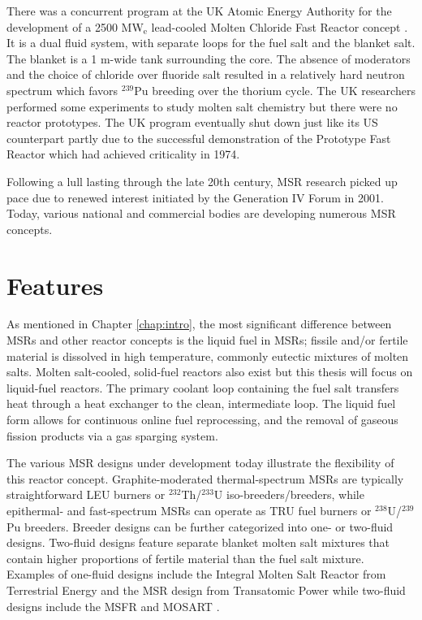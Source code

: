 There was a concurrent program at the UK Atomic Energy Authority for the
development of a 2500 MW$_{\text{e}}$ lead-cooled Molten Chloride Fast Reactor
concept \cite{smith_assessment_1974}. It is a dual fluid system,
with separate loops for the fuel salt and the blanket salt. The blanket is a
1 m-wide tank surrounding the core. The absence of moderators and the choice
of chloride over fluoride salt resulted in a relatively hard neutron spectrum
which favors $^{239}$Pu breeding over the thorium cycle. The UK researchers
performed some experiments to study molten salt chemistry but there were no
reactor prototypes. The UK program eventually shut down just like its
US counterpart partly due to the successful demonstration of the Prototype
Fast Reactor which had achieved criticality in 1974.

Following a lull lasting through the late 20th century, \gls{MSR} research
picked up pace due to renewed interest initiated by the Generation IV Forum in
2001. Today, various national and commercial bodies are developing numerous
\gls{MSR} concepts.

\section{Features}

As mentioned in Chapter \ref{chap:intro}, the most significant difference
between \glspl{MSR} and other reactor concepts is the liquid fuel in
\glspl{MSR}; fissile and/or fertile material is dissolved in high temperature,
commonly eutectic mixtures of molten salts. Molten salt-cooled, solid-fuel
reactors also exist but this thesis will focus on liquid-fuel reactors.
The primary coolant loop containing the fuel salt
transfers heat through a heat exchanger to the clean, intermediate
loop. The liquid fuel form allows for continuous online fuel reprocessing,
and the removal of gaseous fission products via a gas sparging system.

The various \gls{MSR} designs under development today illustrate the
flexibility of this reactor concept. Graphite-moderated thermal-spectrum
\glspl{MSR} are typically straightforward \gls{LEU} burners or
$^{232}$Th/$^{233}$U iso-breeders/breeders, while epithermal- and
fast-spectrum \glspl{MSR} can operate as \gls{TRU} fuel burners or
$^{238}$U/$^{239}$Pu breeders. Breeder designs can be further categorized into
one- or two-fluid designs. Two-fluid designs feature separate blanket molten
salt mixtures that contain higher proportions of fertile material than the
fuel salt mixture. Examples of one-fluid designs include the Integral Molten
Salt Reactor from Terrestrial Energy \cite{leblanc_integral_2015} and the
\gls{MSR} design from Transatomic Power
\cite{transatomic_power_corporation_technical_2016} while two-fluid designs
include the \gls{MSFR} \cite{serp_molten_2014} and \gls{MOSART}
\cite{ignatiev_molten_2014}.

